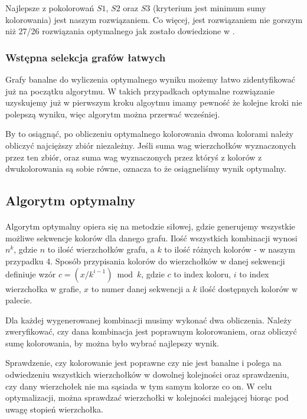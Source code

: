 \documentclass{article}
\begin{document}
Najlepsze z pokolorowań $S1$, $S2$ oraz $S3$ (kryterium jest minimum sumy kolorowania) jest naszym rozwiązaniem. Co więcej, jest rozwiązaniem nie gorszym niż 27/26 rozwiązania optymalnego jak zostało dowiedzione w \cite{kubale-pikies19}.

\subsubsection*{Wstępna selekcja grafów łatwych}

Grafy banalne do wyliczenia optymalnego wyniku możemy łatwo zidentyfikować już na początku algorytmu. W takich przypadkach optymalne rozwiązanie uzyskujemy już w pierwszym kroku algoytmu imamy pewność że kolejne kroki nie polepszą wyniku, więc algorytm można przerwać wcześniej.

By to osiągnąć, po obliczeniu optymalnego kolorowania dwoma kolorami należy obliczyć najcięższy zbiór niezależny. Jeśli suma wag wierzchołków wyznaczonych przez ten zbiór, oraz suma wag wyznaczonych przez któryś z kolorów z dwukolorowania są sobie równe, oznacza to że osiągneliśmy wynik optymalny.

\subsection{Algorytm optymalny}

\paragraph{} Algorytm optymalny opiera się na metodzie siłowej, gdzie generujemy wszystkie możliwe sekwencje kolorów dla danego grafu. Ilość wszystkich kombinacji wynosi $n^k$, gdzie $n$ to ilość wierzchołków grafu, a $k$ to ilość różnych kolorów - w naszym przypadku 4. Sposób przypisania kolorów do wierzchołków w danej sekwencji definiuje wzór $c = (x / k^{i-1}) \bmod k$, gdzie $c$ to index koloru, $i$ to index wierzchołka w grafie, $x$ to numer danej sekwencji a $k$ ilość dostępnych kolorów w palecie. 

Dla każdej wygenerowanej kombinacji musimy wykonać dwa obliczenia. Należy zweryfikować, czy dana kombinacja jest poprawnym kolorowaniem, oraz obliczyć sumę kolorowania, by można było wybrać najlepszy wynik.

Sprawdzenie, czy kolorowanie jest poprawne czy nie jest banalne i polega na odwiedzeniu wszystkich wierzchołków w dowolnej kolejności oraz sprawdzeniu, czy dany wierzchołek nie ma sąsiada w tym samym kolorze co on. W celu optymalizacji, można sprawdzać wierzchołki w kolejności malejącej biorąc pod uwagę stopień wierzchołka.
\end{document}
